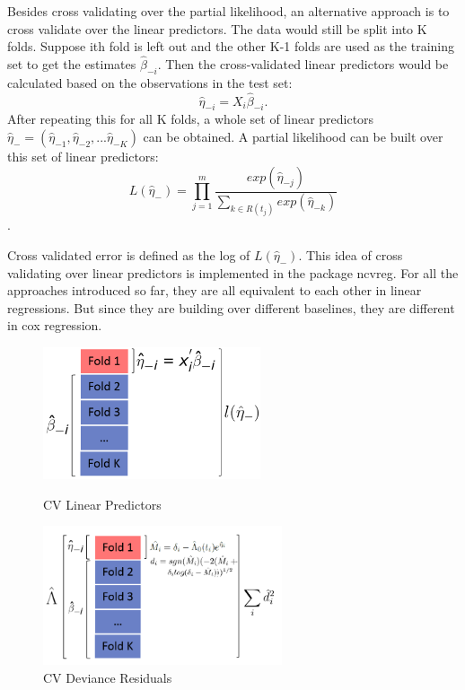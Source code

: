 \documentclass{article}\usepackage[]{graphicx}\usepackage[]{color}
\begin{document}
Besides cross validating over the partial likelihood, an alternative approach is to cross validate over the linear predictors. The data would still be split into K folds. Suppose ith fold is left out and the other K-1 folds are used as the training set to get the estimates $\hat{\beta}_{-i}$. Then the cross-validated linear predictors would be calculated based on the observations in the test set:  \begin{equation}\hat{\eta}_{-i} = X_{i}\hat{\beta}_{-i}.\end{equation} After repeating this for all K folds, a whole set of linear predictors  $\hat{\eta}_{-} = ( \hat{\eta}_{-1},  \hat{\eta}_{-2} , ...  \hat{\eta}_{-K})$ can be obtained. A partial likelihood can be built over this set of linear predictors: \begin{equation} L(\hat{\eta}_{-}) = \prod_{j=1}^{m} \frac{exp (\hat{\eta}_{-j})}{\sum_{ k \in R(t_{j})}exp (\hat{\eta}_{-k})}\end{equation}.

Cross validated error is defined as the log of $L(\hat{\eta}_{-})$. This idea of cross validating over linear predictors is implemented in the package ncvreg. For all the approaches introduced so far, they are all equivalent to each other in linear regressions. But since they are building over different baselines, they are different in cox regression.

   \begin{figure}[h]
    \centering
    \begin{minipage}[b]{0.45\textwidth}
      \centering
		  \includegraphics[height= 3.9cm ]{./figures/03.png}
      \caption{CV Linear Predictors}
     \end{minipage}
     \begin{minipage}[b]{0.45\textwidth}
      \centering
		  \includegraphics[height= 4.1cm ]{./figures/04_2.png}
      \caption{CV Deviance Residuals}
      \end{minipage}	
   \end{figure}	
    
\end{document}
